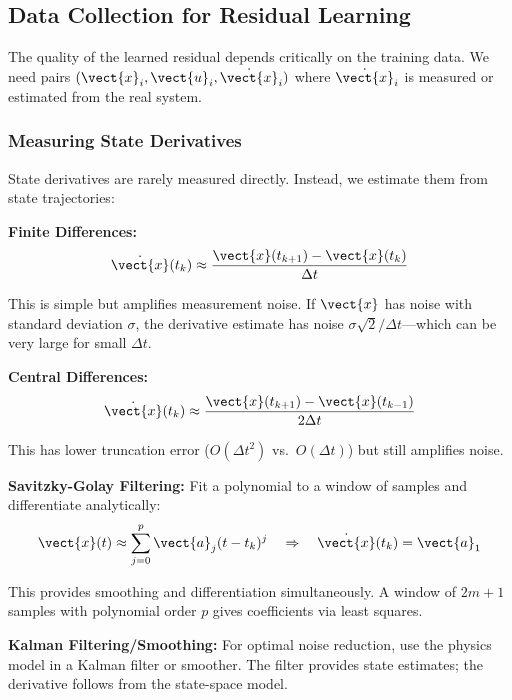 \subsection{Data Collection for Residual Learning}

The quality of the learned residual depends critically on the training data. We need pairs $(\vect{x}_i, \vect{u}_i, \dot{\vect{x}}_i)$ where $\dot{\vect{x}}_i$ is measured or estimated from the real system.

\subsubsection{Measuring State Derivatives}

State derivatives are rarely measured directly. Instead, we estimate them from state trajectories:

\textbf{Finite Differences:}
\begin{equation}
\dot{\vect{x}}(t_k) \approx \frac{\vect{x}(t_{k+1}) - \vect{x}(t_k)}{\Delta t}
\label{eq:forward_diff}
\end{equation}

This is simple but amplifies measurement noise. If $\vect{x}$ has noise with standard deviation $\sigma$, the derivative estimate has noise $\sigma\sqrt{2}/\Delta t$---which can be very large for small $\Delta t$.

\textbf{Central Differences:}
\begin{equation}
\dot{\vect{x}}(t_k) \approx \frac{\vect{x}(t_{k+1}) - \vect{x}(t_{k-1})}{2\Delta t}
\label{eq:central_diff}
\end{equation}

This has lower truncation error ($O(\Delta t^2)$ vs.\ $O(\Delta t)$) but still amplifies noise.

\textbf{Savitzky-Golay Filtering:}
Fit a polynomial to a window of samples and differentiate analytically:
\begin{equation}
\vect{x}(t) \approx \sum_{j=0}^{p} \vect{a}_j (t - t_k)^j \quad \Rightarrow \quad \dot{\vect{x}}(t_k) = \vect{a}_1
\end{equation}

This provides smoothing and differentiation simultaneously. A window of $2m+1$ samples with polynomial order $p$ gives coefficients via least squares.

\textbf{Kalman Filtering/Smoothing:}
For optimal noise reduction, use the physics model in a Kalman filter or smoother. The filter provides state estimates; the derivative follows from the state-space model.

